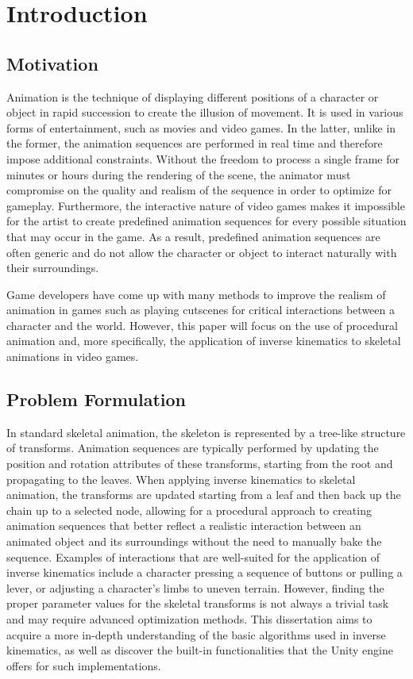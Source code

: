 \chapter{Introduction}
\section{Motivation} 
Animation is the technique of displaying different positions of a character or
object in rapid succession to create the illusion of movement. It is used in
various forms of entertainment, such as movies and video games. In the latter,
unlike in the former, the animation sequences are performed in real time and
therefore impose additional constraints. Without the freedom to process a single
frame for minutes or hours during the rendering of the scene, the animator must
compromise on the quality and realism of the sequence in order to optimize for
gameplay. Furthermore, the interactive nature of video games makes it impossible
for the artist to create predefined animation sequences for every possible
situation that may occur in the game. As a result, predefined animation
sequences are often generic and do not allow the character or object to interact
naturally with their surroundings.

Game developers have come up with many methods to improve the realism of
animation in games such as playing cutscenes for critical interactions between
a character and the world. However, this paper will focus on the use of
procedural animation and, more specifically, the application of inverse
kinematics to skeletal animations in video games.
\section{Problem Formulation}
In standard skeletal animation, the skeleton is represented by a tree-like
structure of transforms. Animation sequences are typically performed by updating
the position and rotation attributes of these transforms, starting from the root
and propagating to the leaves. When applying inverse kinematics to skeletal
animation, the transforms are updated starting from a leaf and then back up the
chain up to a selected node, allowing for a procedural approach to creating
animation sequences that better reflect a realistic interaction between an
animated object and its surroundings without the need to manually bake the
sequence. Examples of interactions that are well-suited for the application of
inverse kinematics include a character pressing a sequence of buttons or pulling
a lever, or adjusting a character's limbs to uneven terrain. However, finding
the proper parameter values for the skeletal transforms is not always a trivial
task and may require advanced optimization methods. This dissertation aims to
acquire a more in-depth understanding of the basic algorithms used in inverse
kinematics, as well as discover the built-in functionalities that the Unity
engine offers for such implementations.
